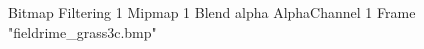 {Bitmap
	{Filtering 1}
	{Mipmap 1}
	{Blend alpha}
	{AlphaChannel 1}
	{Frame "fieldrime_grass3c.bmp"}
}
